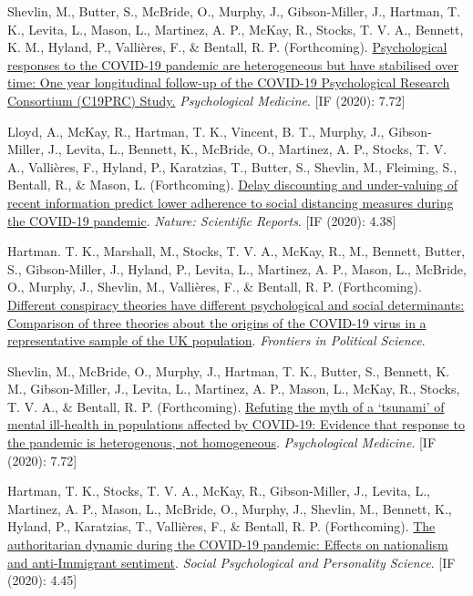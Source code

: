 \documentclass[12pt]{article}
\begin{document}
\begin{bibenum}
	\item Shevlin, M., Butter, S., McBride, O., Murphy, J., Gibson-Miller, J., Hartman, T. K.,
	Levita, L., Mason, L., Martinez, A. P.,  
	McKay, R., Stocks, T. V. A., Bennett, K. M.,  Hyland, P., Vallières, F., \& Bentall, R. P. (Forthcoming). 
		\href{https://psyarxiv.com/42dfu/}
		{Psychological responses to the COVID-19 pandemic are heterogeneous but have stabilised over time: 
		One year longitudinal follow-up of the COVID-19 Psychological Research Consortium (C19PRC) Study.}
		\emph{Psychological Medicine}. [IF (2020): 7.72]

	\item Lloyd, A., McKay, R., Hartman, T. K., Vincent, B. T., Murphy, J., Gibson- Miller, J., Levita, L., 
	Bennett, K., McBride, O.,  Martinez, A. P., Stocks, T. V. A., Vallières, F., Hyland, P., Karatzias, T., 
	Butter, S., Shevlin, M., Fleiming, S., Bentall, R., \& Mason, L.  (Forthcoming). 
		\href{https://psyarxiv.com/kvynr/}
		{Delay discounting and under-valuing of recent information predict lower adherence 
		to social distancing measures during the COVID-19 	pandemic}.
		\emph{Nature: Scientific Reports}. [IF (2020): 4.38]

	\item Hartman. T. K., Marshall, M., Stocks, T. V. A., McKay, R., M., 
	Bennett, Butter, S., Gibson-Miller, J.,  Hyland, P., Levita, L., Martinez, A. P., 
	Mason, L., McBride, O., Murphy, J., Shevlin, M., Vallières, F., 
	\& Bentall, R. P.  (Forthcoming). 
		\href{https://doi.org/10.3389/fpos.2021.642510}{Different conspiracy theories have 
		different psychological and social determinants: Comparison of three 
		theories about the origins of the COVID-19 virus in a representative 
		sample of the UK population}.
		\emph{Frontiers in Political Science}.
	
	\item Shevlin, M.,  McBride, O., Murphy, J., Hartman, T. K., Butter, S., 
	Bennett, K. M., Gibson-Miller, J., Levita, L., Martinez, A. P., Mason, L., 
	McKay, R., Stocks, T. V. A.,  \& Bentall, R. P. (Forthcoming). 
		\href{https://doi.org/10.1017/S0033291721001665}{Refuting the myth 
		of a ‘tsunami’ of mental ill-health in populations affected by 
		COVID-19: Evidence that response to the pandemic is heterogenous, 
		not homogeneous}.
		\emph{Psychological Medicine}. [IF (2020): 7.72]

	\item Hartman, T. K.,  Stocks, T. V. A., McKay, R., Gibson-Miller, J., Levita, L., 
	Martinez, A. P., Mason, L., McBride, O., Murphy, J., Shevlin, M., Bennett, K., 
	Hyland, P., Karatzias, T., Vallières, F., \& Bentall, R. P. (Forthcoming). 
		\href{https://doi.org/10.1177/1948550620978023}{The authoritarian 
		dynamic during the COVID-19 pandemic: Effects on nationalism and 
		anti-Immigrant sentiment}.
		\emph{Social Psychological and Personality Science}. [IF (2020): 4.45]
	

\end{bibenum}
\end{document}
